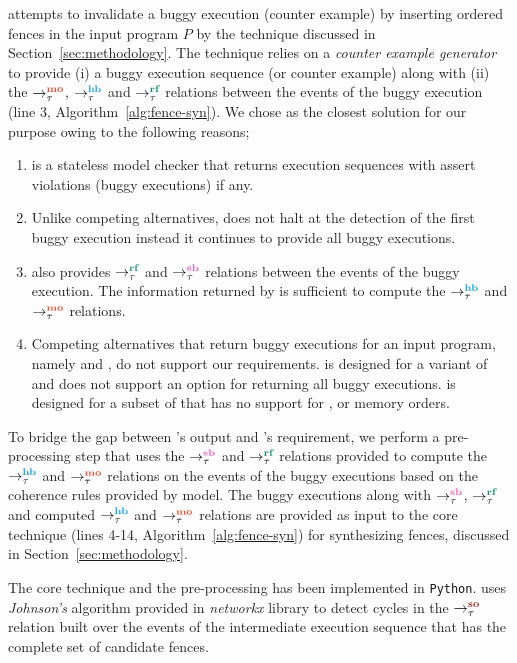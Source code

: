 \ourtechnique attempts to invalidate a buggy execution (\aka counter
example) by inserting \sc ordered fences in the input program $P$
by the technique discussed in Section~\ref{sec:methodology}.
%
The technique relies on a {\em counter example generator} to provide
(i) a buggy execution sequence (or counter example) along with (ii)
the $\setMO$, $\setHB$ and $\setRF$ relations between the events of the
buggy execution (line 3, Algorithm~\ref{alg:fence-syn}).
%
We chose \cds \cite{cds} as the closest solution for our purpose
owing to the following reasons;

\begin{enumerate}
	\item \cds is a stateless model checker that returns execution sequences 
		with assert violations (\aka buggy executions) if any.
	
	\item Unlike competing alternatives, \cds does not halt at the detection 
		of the first buggy execution instead it continues to provide all buggy 
		executions.
	
	\item \cds also provides $\setRF$ and $\setSB$ relations between the events 
		of the buggy execution. The information returned by \cds is sufficient
		to compute the $\setHB$ and $\setMO$ relations.
	
	\item Competing alternatives that return buggy executions for an input
		program, namely \genmc \cite{genmc-PLDI19} and \tracer \cite{tracer2018}, 
		do not support our requirements.
		\genmc is designed for a variant of \cc \cite{LahavVafeiadis-PLDI17} and
		does not support an option for returning all buggy executions. \tracer is
		designed for a subset of \cc that has no support for \sc, \na or \rel 
		memory orders.
\end{enumerate}

To bridge the gap between \cds's output and \ourtechnique's requirement,
we perform a pre-processing step that uses the $\setSB$ and $\setRF$ relations 
provided \cds to compute the $\setHB$ and $\setMO$ relations on the events
of the buggy executions based on the coherence rules provided by \cc model.
%
The buggy executions along with $\setSB$, $\setRF$ and computed $\setHB$ 
and $\setMO$ relations are provided as input to the core technique 
(lines 4-14, Algorithm~\ref{alg:fence-syn}) for synthesizing fences,
discussed in Section~\ref{sec:methodology}.

The core technique and the pre-processing has been implemented in 
{\tt Python}.
\ourtechnique uses {\em Johnson's} algorithm provided in {\em networkx}
library to detect cycles in the $\setSO$ relation built over the \sc
events of the intermediate execution sequence that has the complete set 
of candidate fences.

